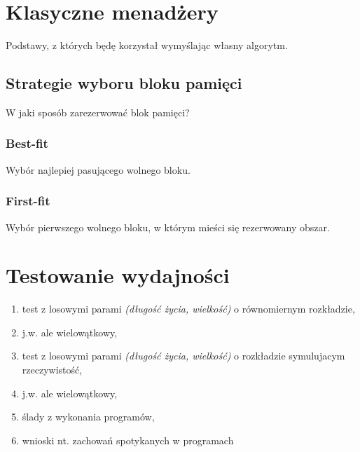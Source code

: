 \documentclass[12pt,a4paper,titlepage,twoside]{mwart}
\begin{document}
\newpage


\section{Klasyczne menadżery}

Podstawy, z których będę korzystał wymyślając własny algorytm.

\subsection{Strategie wyboru bloku pamięci}

W jaki sposób zarezerwować blok pamięci?

\subsubsection{Best-fit}

Wybór najlepiej pasującego wolnego bloku.

\subsubsection{First-fit}

Wybór pierwszego wolnego bloku, w którym mieści się rezerwowany obszar.

\newpage


\section{Testowanie wydajności}

\begin{enumerate}
\item test z losowymi parami \textit{(długość życia, wielkość)} o równomiernym rozkładzie,
\item j.w. ale wielowątkowy,
\item test z losowymi parami \textit{(długość życia, wielkość)} o rozkładzie symulujacym rzeczywistość,
\item j.w. ale wielowątkowy,
\item ślady z wykonania programów,
\item wnioski nt. zachowań spotykanych w programach
\end{enumerate}
\end{document}
